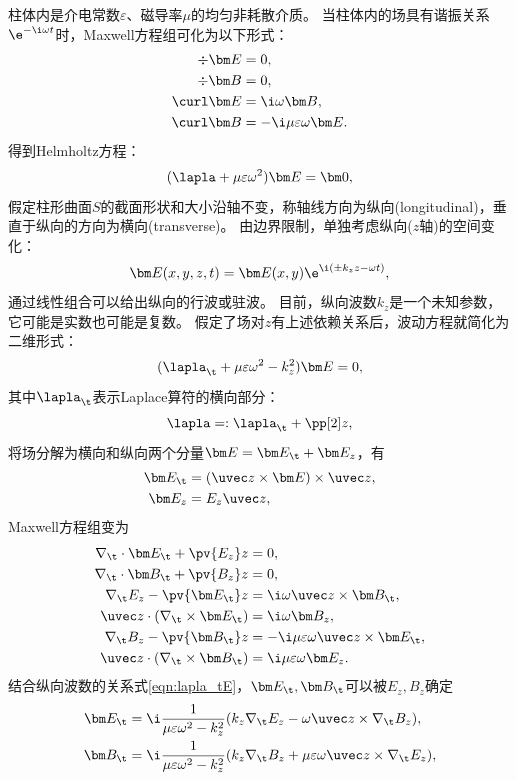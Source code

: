 柱体内是介电常数$\varepsilon$、磁导率$\mu$的均匀非耗散介质。
当柱体内的场具有谐振关系$\e^{-\i\omega t}$时，Maxwell方程组可化为以下形式：
\begin{subequations}
    \begin{align}
        \div\bm E&=0,\\
        \div\bm B&=0,\\
        \curl\bm E&=\i\omega\bm B,\\
        \curl\bm B&=-\i\mu\varepsilon\omega\bm E.
    \end{align}
\end{subequations}
得到Helmholtz方程：
\[
    (\lapla+\mu\varepsilon\omega^2)\bm E=\bm 0,
\]
假定柱形曲面$S$的截面形状和大小沿轴不变，称轴线方向为纵向(longitudinal)，垂直于纵向的方向为横向(transverse)。
由边界限制，单独考虑纵向($z$轴)的空间变化：
\[
    \bm E(x,y,z,t)=\bm E(x,y)\e^{\i(\pm k_zz-\omega t)},
\]
通过线性组合可以给出纵向的行波或驻波。
目前，纵向波数$k_z$是一个未知参数，它可能是实数也可能是复数。
假定了场对$z$有上述依赖关系后，波动方程就简化为二维形式：
\begin{equation}
    \label{eqn:lapla_tE}
    (\lapla_\t+\mu\varepsilon\omega^2-k_z^2)\bm E=0,
\end{equation}
其中$\lapla_\t$表示Laplace算符的横向部分：
\[
    \lapla=:\lapla_\t+\pp[2]z,
\]
将场分解为横向和纵向两个分量$\bm E=\bm E_\t+\bm E_z$，有
\begin{subequations}
    \begin{align}
        \bm E_\t&=(\uvec z\times\bm E)\times\uvec z,\\
        \bm E_z&=E_z\uvec z,
    \end{align}
\end{subequations}
Maxwell方程组变为
\begin{subequations}
    \label{eqn:EtEzBtBz}
    \begin{align}
        \nabla_\t\cdot\bm E_\t+\pv{E_z}z&=0,\\
        \nabla_\t\cdot\bm B_\t+\pv{B_z}z&=0,\\
        \nabla_\t E_z-\pv{\bm E_\t}z&=\i\omega\uvec z\times\bm B_\t,\\
        \uvec z\cdot(\nabla_\t\times\bm E_\t)&=\i\omega\bm B_z,\\
        \nabla_\t B_z-\pv{\bm B_\t}z&=-\i\mu\varepsilon\omega\uvec z\times\bm E_\t,\\
        \uvec z\cdot(\nabla_\t\times\bm B_\t)&=\i\mu\varepsilon\omega\bm E_z.
    \end{align}
\end{subequations}
结合纵向波数的关系式\eqref{eqn:lapla_tE}，$\bm E_\t,\bm B_\t$可以被$E_z,B_z$确定
\begin{subequations}
    \label{eqn:EtBt=EzBz}
    \begin{align}
        \label{eqn:Et=EzBz}
        \bm E_\t&=\i\frac1{\mu\varepsilon\omega^2-k_z^2}(k_z\nabla_\t E_z-\omega\uvec z\times\nabla_\t B_z),\\
        \label{eqn:Bt=EzBz}
        \bm B_\t&=\i\frac1{\mu\varepsilon\omega^2-k_z^2}(k_z\nabla_\t B_z+\mu\varepsilon\omega\uvec z\times\nabla_\t E_z),
    \end{align}
\end{subequations}

